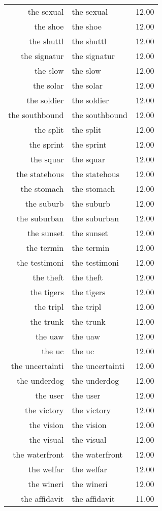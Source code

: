 \begin{table}[ht]
\begin{tabular}{rlr}
  the sexual & the sexual & 12.00 \\ 
  the shoe & the shoe & 12.00 \\ 
  the shuttl & the shuttl & 12.00 \\ 
  the signatur & the signatur & 12.00 \\ 
  the slow & the slow & 12.00 \\ 
  the solar & the solar & 12.00 \\ 
  the soldier & the soldier & 12.00 \\ 
  the southbound & the southbound & 12.00 \\ 
  the split & the split & 12.00 \\ 
  the sprint & the sprint & 12.00 \\ 
  the squar & the squar & 12.00 \\ 
  the statehous & the statehous & 12.00 \\ 
  the stomach & the stomach & 12.00 \\ 
  the suburb & the suburb & 12.00 \\ 
  the suburban & the suburban & 12.00 \\ 
  the sunset & the sunset & 12.00 \\ 
  the termin & the termin & 12.00 \\ 
  the testimoni & the testimoni & 12.00 \\ 
  the theft & the theft & 12.00 \\ 
  the tigers & the tigers & 12.00 \\ 
  the tripl & the tripl & 12.00 \\ 
  the trunk & the trunk & 12.00 \\ 
  the uaw & the uaw & 12.00 \\ 
  the uc & the uc & 12.00 \\ 
  the uncertainti & the uncertainti & 12.00 \\ 
  the underdog & the underdog & 12.00 \\ 
  the user & the user & 12.00 \\ 
  the victory & the victory & 12.00 \\ 
  the vision & the vision & 12.00 \\ 
  the visual & the visual & 12.00 \\ 
  the waterfront & the waterfront & 12.00 \\ 
  the welfar & the welfar & 12.00 \\ 
  the wineri & the wineri & 12.00 \\ 
  the affidavit & the affidavit & 11.00 \\ 

\end{tabular}
\end{table}
